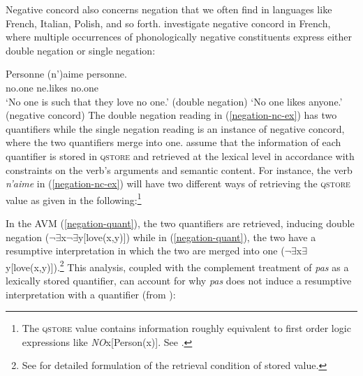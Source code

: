 \documentclass[output=paper
                ,modfonts
                ,nonflat
	        ,collection
	        ,collectionchapter
	        ,collectiontoclongg
 	        ,biblatex
                ,babelshorthands
                ,newtxmath
                ,draftmode
                ,colorlinks, citecolor=brown
]{./langsci/langscibook}
\begin{document}
{\begin{exe}
\begin{xlist}
Negative concord also concerns negation that
we often find in languages like French, Italian, Polish, and so forth.   investigate  negative concord in French, where multiple occurrences
of phonologically negative constituents express either
double negation or single negation:

\ea \label{negation-nc-ex}
\gll Personne (n')aime personne.\\
     no.one ne.likes no.one\\
\glt `No one is such that they love no one.' \hfill (double negation)
\glt `No one likes anyone.' \hfill  (negative concord)
\z
%
%
The double negation reading in (\ref{negation-nc-ex}) has two quantifiers while the single
negation reading is an instance of negative concord, where the two
quantifiers merge into one.  assume that the information of
each quantifier is stored in \textsc{qstore} and retrieved at the
lexical level in accordance with constraints on the verb's arguments and semantic
content. For instance, the verb \textit{n'aime} in (\ref{negation-nc-ex}) will have two different ways of retrieving the
\textsc{qstore} value as given in the following:\footnote{The
\textsc{qstore} value contains information
roughly equivalent to first order logic expressions like \textit{NO}x[Person(x)]. See \citet{Swart:02}.}

\eal
\ex
{}
\ex
{}
\label{negation-quant}
\zl
%
%
\noindent
In the AVM (\ref{negation-quant}), the two quantifiers are retrieved, inducing double negation ($\neg\exists$x$\neg\exists$y[love(x,y)]) while in (\ref{negation-quant}), the two have a resumptive interpretation in which the two are merged into one ($\neg\exists$x$\exists$y[love(x,y)]).\footnote{See \citet{Swart:02} for detailed formulation of the retrieval condition of stored value.} This analysis, coupled with the complement treatment of \textit{pas} as a lexically stored quantifier, can account
for why \emph{pas} does not induce a resumptive interpretation with a quantifier (from \citealt{Swart:02}):



\end{xlist}
\end{exe}}
\end{document}

